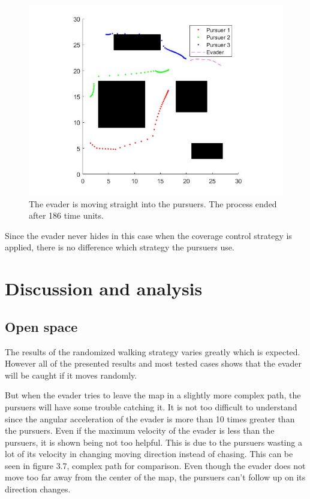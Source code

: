 \documentclass[ebook,11pt] {kth-mag}
\begin{document}
\begin{figure}[H]
\includegraphics[scale=0.4]{stupid_evader}
\centering
\caption{The evader is moving straight into the pursuers. The process ended after 186 time units. }
\end{figure}

Since the evader never hides in this case when the coverage control strategy is applied, there is no difference which strategy the pursuers use. 

\chapter{Discussion and analysis}

\section{Open space}
The results of the randomized walking strategy varies greatly which is expected. However all of the presented results and most tested cases shows that the evader will be caught if it moves randomly. 

But when the evader tries to leave the map in a slightly more complex path, the pursuers will have some trouble catching it. It is not too difficult to understand since the angular acceleration of the evader is more than 10 times greater than the pursuers. Even if the maximum velocity of the evader is less than the pursuers, it is shown being not too helpful. This is due to the pursuers wasting a lot of its velocity in changing moving direction instead of chasing. This can be seen in figure 3.7, complex path for comparison. Even though the evader does not move too far away from the center of the map, the pursuers can't follow up on its direction changes. 
\end{document}
